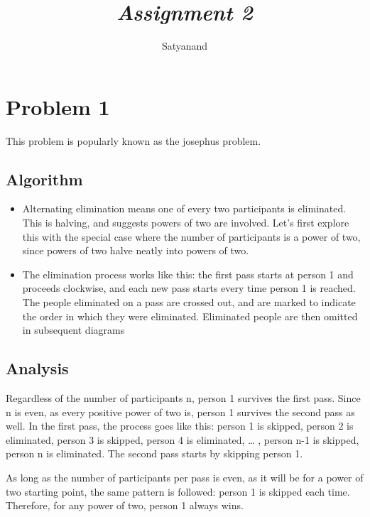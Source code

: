 \documentclass[12pt]{article}
\title{{\it Assignment 2\/} }
\author
{Satyanand\\
\normalize{\textbf{14EC10049}}
}
\date{}
\begin{document}
 


\baselineskip24pt


\maketitle 

\section*{Problem 1}


This problem is popularly known as the josephus problem.

\subsection*{Algorithm}
\begin{itemize}

    
\item Alternating elimination means one of every two participants is eliminated. This is halving, and suggests powers of two are involved. Let’s first explore this with the special case where the number of participants is a power of two, since powers of two halve neatly into powers of two.
\item The elimination process works like this: the first pass starts at person 1 and proceeds clockwise, and each new pass starts every time person 1 is reached. The people eliminated on a pass are crossed out, and are marked to indicate the order in which they were eliminated. Eliminated people are then omitted in subsequent diagrams

\end{itemize}
\subsection*{ Analysis}
Regardless of the number of participants n, person 1 survives the first pass. Since n is even, as every positive power of two is, person 1 survives the second pass as well. In the first pass, the process goes like this: person 1 is skipped, person 2 is eliminated, person 3 is skipped, person 4 is eliminated, … , person n-1 is skipped, person n is eliminated. The second pass starts by skipping person 1.

As long as the number of participants per pass is even, as it will be for a power of two starting point, the same pattern is followed: person 1 is skipped each time. Therefore, for any power of two, person 1 always wins.
\end{document}
